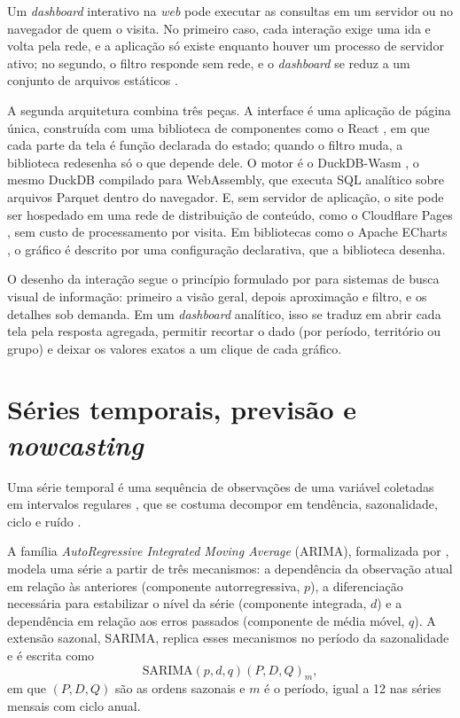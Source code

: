 Um \textit{dashboard} interativo na \textit{web} pode executar as consultas em um servidor ou no navegador de quem o visita. No primeiro caso, cada interação exige uma ida e volta pela rede, e a aplicação só existe enquanto houver um processo de servidor ativo; no segundo, o filtro responde sem rede, e o \textit{dashboard} se reduz a um conjunto de arquivos estáticos \cite{Kohn2022}.

A segunda arquitetura combina três peças. A interface é uma aplicação de página única, construída com uma biblioteca de componentes como o React \cite{React2026}, em que cada parte da tela é função declarada do estado; quando o filtro muda, a biblioteca redesenha só o que depende dele. O motor é o DuckDB-Wasm \cite{Kohn2022}, o mesmo DuckDB compilado para WebAssembly, que executa SQL analítico sobre arquivos Parquet dentro do navegador. E, sem servidor de aplicação, o site pode ser hospedado em uma rede de distribuição de conteúdo, como o Cloudflare Pages \cite{CloudflarePages2026}, sem custo de processamento por visita. Em bibliotecas como o Apache ECharts \cite{Li2018}, o gráfico é descrito por uma configuração declarativa, que a biblioteca desenha.

O desenho da interação segue o princípio formulado por  para sistemas de busca visual de informação: primeiro a visão geral, depois aproximação e filtro, e os detalhes sob demanda. Em um \textit{dashboard} analítico, isso se traduz em abrir cada tela pela resposta agregada, permitir recortar o dado (por período, território ou grupo) e deixar os valores exatos a um clique de cada gráfico.

\section{Séries temporais, previsão e \textit{nowcasting}}
\label{subsec:origem-movel}
\label{subsec:metricas}
\label{subsec:nowcasting}

Uma série temporal é uma sequência de observações de uma variável coletadas em intervalos regulares \cite{Hyndman2021}, que se costuma decompor em tendência, sazonalidade, ciclo e ruído \cite{Box2015}.

\label{subsec:sarima}

A família \textit{AutoRegressive Integrated Moving Average} (ARIMA), formalizada por , modela uma série a partir de três mecanismos: a dependência da observação atual em relação às anteriores (componente autorregressiva, $p$), a diferenciação necessária para estabilizar o nível da série (componente integrada, $d$) e a dependência em relação aos erros passados (componente de média móvel, $q$). A extensão sazonal, SARIMA, replica esses mecanismos no período da sazonalidade e é escrita como
\begin{equation}
    \text{SARIMA}(p, d, q)(P, D, Q)_m,
\end{equation}
em que $(P, D, Q)$ são as ordens sazonais e $m$ é o período, igual a 12 nas séries mensais com ciclo anual.

